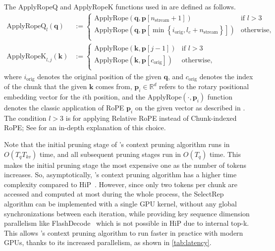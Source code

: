 The ApplyRopeQ and ApplyRopeK functions used in  are defined as follows.
\begin{align}
    \text{ApplyRopeQ}_l(\bm{q}) &:= \begin{cases}
        \text{ApplyRope}(\bm{q}, \bm{p}[n_\text{stream} + 1]) & \text{if $l > 3$} \\
        \text{ApplyRope}(\bm{q}, \bm{p}[\min\left\{i_\text{orig}, l_c + n_\text{stream}\right\}]) & \text{otherwise,} \\
    \end{cases} \\
    \text{ApplyRopeK}_{l,j}(\bm{k}) &:= \begin{cases}
        \text{ApplyRope}(\bm{k}, \bm{p}[j - 1]) & \text{if $l > 3$} \\
        \text{ApplyRope}(\bm{k}, \bm{p}[c_\text{orig}]) & \text{otherwise,} \\
    \end{cases}
\end{align}
where $i_\text{orig}$ denotes the original position of the given $\bm{q}$, and $c_\text{orig}$ denotes the index of the chunk that the given $\bm{k}$ comes from, $\bm{p}_i \in \mathbb{R}^{d}$ refers to the rotary positional embedding vector for the $i$th position, and the $\text{ApplyRope}(\cdot, \bm{p}_i)$ function denotes the classic application of RoPE $\bm{p}_i$ on the given vector as described in \citet{su_roformer_2023}. The condition $l > 3$ is for applying Relative RoPE instead of Chunk-indexed RoPE; See  for an in-depth explanation of this choice.

Note that the initial pruning stage of \ours's context pruning algorithm runs in $O(T_q T_{kv})$ time, and all subsequent pruning stages run in $O(T_q)$ time. This makes the initial pruning stage the most expensive one as the number of tokens increases. So, asymptotically, \ours's context pruning algorithm has a higher time complexity compared to HiP~\citep{lee_training-free_2024}.
However, since only two tokens per chunk are accessed and computed at most during the whole process, the SelectRep algorithm can be implemented with a single GPU kernel, without any global synchronizations between each iteration, while providing key sequence dimension parallelism like FlashDecode~\citep{dao_flash_decoding} which is not possible in HiP due to internal top-k.
This allows \ours's context pruning algorithm to run faster in practice with modern GPUs, thanks to its increased parallelism, as shown in \cref{tab:latency}.

